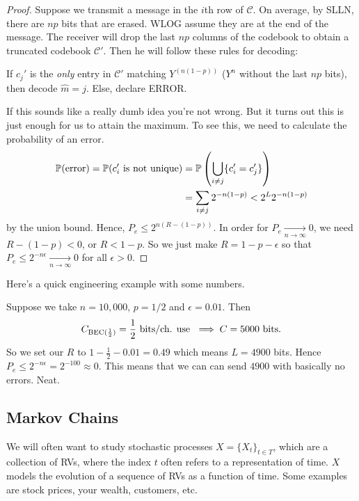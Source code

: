 \documentclass[11 pt]{scrartcl}
\begin{document}
\begin{proof}
    Suppose we transmit a message in the $i$th row of $\mathcal{C}$. On average, by SLLN, there are $np$ bits that are erased. WLOG assume they are at the end of the message. The receiver will drop the last $np$ columns of the codebook to obtain a truncated codebook $\mathcal{C}'$. Then he will follow these rules for decoding: 
    \begin{enumerate}
        \ii If $c_j'$ is the \emph{only} entry in $\mathcal{C}'$ matching $Y^{(n(1-p))}$ ($Y^n$ without the last $np$ bits), then decode $\hat{m} = j$. 
        \ii Else, declare ERROR. 
    \end{enumerate}
    If this sounds like a really dumb idea you're not wrong. But it turns out this is just enough for us to attain the maximum. To see this, we need to calculate the probability of an error.  
\begin{align*}
    \mathbb P(\text{error}) = \mathbb P(c'_i\text{ is not unique}) 
    &= \mathbb P\left(\bigcup_{i\not= j} \{c_i' = c_j'\}\right) \\ 
    &= \sum_{i\not= j} 2^{-n(1-p)} < 2^L 2^{-n(1-p)}
\end{align*}
by the union bound. Hence, $P_e \leq 2^{n(R-(1-p))}$. In order for $P_e \xrightarrow[n\to\infty]{} 0$, we need $R-(1-p) < 0$, or $R < 1-p$. So we just make $R = 1-p-\epsilon$ so that $P_e \leq 2^{-n\epsilon} \xrightarrow[n\to\infty]{} 0$ for all $\epsilon > 0$. 
\end{proof}

Here's a quick engineering example with some numbers. 
\begin{example}
    Suppose we take $n = 10,000$, $p = 1/2$ and $\epsilon = 0.01$. Then 
    \[ C_{\text{BEC}(\frac{1}{2})} = \dfrac{1}{2} \text{ bits/ch. use } \implies C = 5000\text{ bits.}\] 
    So we set our $R$ to $1-\frac{1}{2} - 0.01 = 0.49$ which means $L = 4900$ bits. Hence $P_e \leq 2^{-n\epsilon} = 2^{-100} \approx 0$. This means that we can can send $4900$ with basically no errors. Neat. 
\end{example}

\subsection{Markov Chains}

We will often want to study stochastic processes $X = \{X_t\}_{t\in T}$, which are a collection of RVs, where the index $t$ often refers to a representation of time. $X$ models the evolution of a sequence of RVs as a function of time. Some examples are stock prices, your wealth, customers, etc. 
\end{document}
